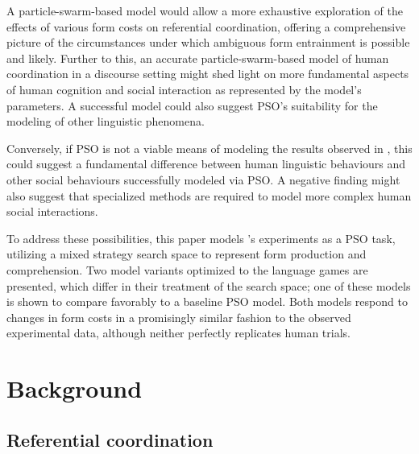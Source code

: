 \documentclass[12pt,a4paper]{article}
\begin{document}
A particle-swarm-based model would allow a more exhaustive exploration of the effects of various form costs on referential coordination, offering a comprehensive picture of the circumstances under which ambiguous form entrainment is possible and likely. Further to this, an accurate particle-swarm-based model of human coordination in a discourse setting might shed light on more fundamental aspects of human cognition and social interaction as represented by the model's parameters. A successful model could also suggest PSO's suitability for the modeling of other linguistic phenomena. 

Conversely, if PSO is not a viable means of modeling the results observed in \citeauthor{rohde2012}, this could suggest a fundamental difference between human linguistic behaviours and other social behaviours successfully modeled via PSO. A negative finding might also suggest that specialized methods are required to model more complex human social interactions.

To address these possibilities, this paper models \citeauthor{rohde2012}'s experiments as a PSO task, utilizing a mixed strategy search space to represent form production and comprehension. Two model variants optimized to the \citeauthor{rohde2012} language games are presented, which differ in their treatment of the search space; one of these models is shown to compare favorably to a baseline PSO model. Both models respond to changes in form costs in a promisingly similar fashion to the observed experimental data, although neither perfectly replicates human trials.


\section{Background}
\subsection{Referential coordination}
\end{document}
